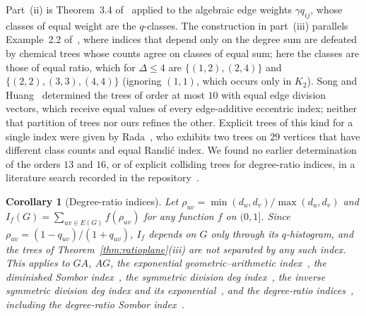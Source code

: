 \documentclass[a5paper, 10pt]{article}
\theoremstyle{plain}
\newtheorem*{corollary}{Corollary}
\theoremstyle{remark}
\theoremstyle{definition}
\begin{document}
  Part~(ii) is Theorem~3.4 of~\cite{Rada2019ExpVDB} applied to the
  algebraic edge weights $\gamma q_{ij}$, whose classes of equal weight are
  the $q$-classes. The construction in part~(iii) parallels Example~2.2
  of~\cite{RadaRodriguezSigarreta2022Weak}, where indices that depend
  only on the degree sum are defeated by chemical trees whose counts agree
  on classes of equal sum; here the classes are those of equal ratio, which
  for $\Delta \le 4$ are $\{(1,2),(2,4)\}$ and $\{(2,2),(3,3),(4,4)\}$ (ignoring
  $(1,1)$, which occurs only in $K_2$).
  Song and Huang~\cite{SongHuang2023EDV} determined the trees of order at
  most $10$ with equal edge division vectors, which receive equal values of
  every edge-additive eccentric index; neither that partition of trees nor
  ours refines the other. Explicit trees of this kind for a single index were given by Rada~\cite[Example~2.6]{Rada2019ExpVDB}, who exhibits two trees on $29$ vertices that have different class counts and equal Randi\'c index. We found no earlier determination of the orders $13$ and
  $16$, or of explicit colliding trees for degree-ratio indices, in a
  literature search recorded in the repository~\cite{LoyolaRepo}.

  \begin{corollary}[Degree-ratio indices]\label{cor:ratioclass}
  Let $\rho_{uv} = \min(d_u,d_v)/\max(d_u,d_v)$ and
  $I_f(G) = \sum_{uv \in E(G)} f(\rho_{uv})$ for any function $f$ on
  $(0,1]$. Since $\rho_{uv} = (1-q_{uv})/(1+q_{uv})$, $I_f$ depends on $G$
  only through its $q$-histogram, and the trees of
  Theorem~\ref{thm:ratioplane}(iii) are not separated by any such index.
  This applies to $GA$, $AG$, the exponential geometric--arithmetic
  index~\cite{DasMondal2024ExpGA}, the diminished Sombor
  index~\cite{MovahediGutmanRedzepovicFurtula2026}, the symmetric division
  deg index~\cite{VukicevicGasperov2010}, the inverse symmetric division
  deg index and its exponential~\cite{DasMondalRazaPal2025ExpISDD}, and
  the degree-ratio
  indices~\cite{NyauliBuragohain2027DRSO, GutmanBuragohainNyauli2026},
  including the degree-ratio Sombor
  index~\cite{GutmanRedzepovicBuragohainNyauli2027, AliGutmanEtAl2027DRSO, ShaoJahanbani2027}.
  \end{corollary}
\end{document}
